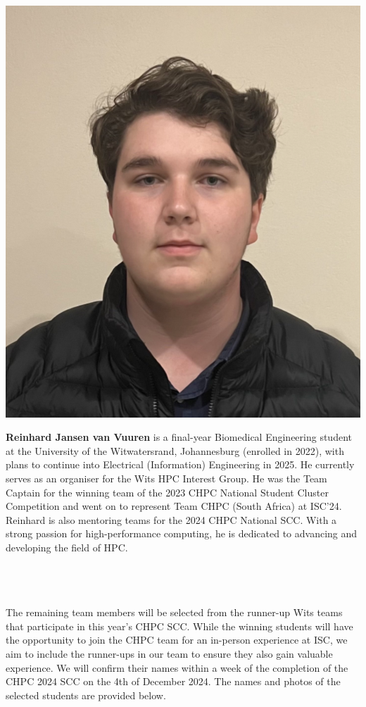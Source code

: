 \documentclass[10pt, onecolumn]{IEEEtran}
\begin{document}
\begin{minipage}{0.2\textwidth}
  \includegraphics[width=\textwidth]{reinhard_bio.png}
\end{minipage}
\hspace{0.02\textwidth} %
\begin{minipage}{0.65\textwidth}
\textbf{Reinhard Jansen van Vuuren} is a final-year Biomedical Engineering student at the University of the Witwatersrand, Johannesburg (enrolled in 2022), with plans to continue into Electrical (Information) Engineering in 2025. He currently serves as an organiser for the Wits HPC Interest Group. He was the Team Captain for the winning team of the 2023 CHPC National Student Cluster Competition and went on to represent Team CHPC (South Africa) at ISC'24. Reinhard is also mentoring teams for the 2024 CHPC National SCC. With a strong passion for high-performance computing, he is dedicated to advancing and developing the field of HPC.
\end{minipage}
\\\\\\
\noindent
The remaining team members will be selected from the runner-up Wits teams that participate in this year's CHPC SCC. While the winning students will have the opportunity to join the CHPC team for an in-person experience at ISC, we aim to include the runner-ups in our team to ensure they also gain valuable experience. We will confirm their names within a week of the completion of the CHPC 2024 SCC on the 4th of December 2024. The names and photos of the selected students are provided below.
\end{document}
